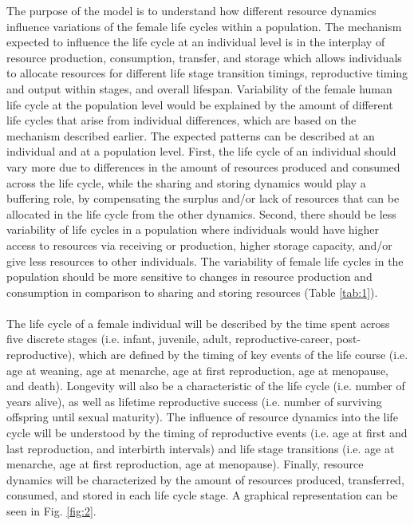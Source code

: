 \documentclass{article}
\begin{document}
The purpose of the model is to understand how different resource dynamics influence variations of the female life cycles within a population. The mechanism expected to influence the life cycle at an individual level is in the interplay of resource production, consumption, transfer, and storage which allows individuals to allocate resources for different life stage transition timings, reproductive timing and output within stages, and overall lifespan. Variability of the female human life cycle at the population level would be explained by the amount of different life cycles that arise from individual differences, which are based on the mechanism described earlier. The expected patterns can be described at an individual and at a population level. First, the life cycle of an individual should vary more due to differences in the amount of resources produced and consumed across the life cycle, while the sharing and storing dynamics would play a buffering role, by compensating the surplus and/or lack of resources that can be allocated in the life cycle from the other dynamics. Second, there should be less variability of life cycles in a population where individuals would have higher access to resources via receiving or production, higher storage capacity, and/or give less resources to other individuals. The variability of female life cycles in the population should be more sensitive to changes in resource production and consumption in comparison to sharing and storing resources (Table \ref{tab:1}).
\\\\
The life cycle of a female individual will be described by the time spent across five discrete stages (i.e. infant, juvenile, adult, reproductive-career, post-reproductive), which are defined by the timing of key events of the life course (i.e. age at weaning, age at menarche, age at first reproduction, age at menopause, and death). Longevity will also be a characteristic of the life cycle (i.e. number of years alive), as well as lifetime reproductive success (i.e. number of surviving offspring until sexual maturity). The influence of resource dynamics into the life cycle will be understood by the timing of reproductive events (i.e. age at first and last reproduction, and interbirth intervals) and life stage transitions (i.e. age at menarche, age at first reproduction, age at menopause). Finally, resource dynamics will be characterized by the amount of resources produced, transferred, consumed, and stored in each life cycle stage. A graphical representation can be seen in Fig. \ref{fig:2}.
\end{document}
